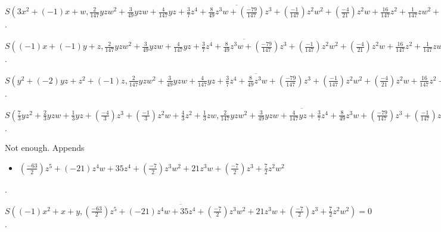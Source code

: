 \documentclass{jsarticle}
\begin{document}
$\overline{S(3x^{2}+(-1)x+w, \frac{2}{147}yzw^{2}+\frac{3}{49}yzw+\frac{4}{147}yz+\frac{3}{7}z^{4}+\frac{8}{49}z^{3}w+(\frac{-79}{147})z^{3}+(\frac{-1}{147})z^{2}w^{2}+(\frac{-4}{21})z^{2}w+\frac{16}{147}z^{2}+\frac{1}{147}zw^{2}+\frac{4}{147}zw)} = (\frac{-1}{84})yzw+(\frac{-1}{21})yz+(\frac{-63}{2})z^{5}+(\frac{-39}{2})z^{4}w+\frac{137}{4}z^{4}+(\frac{-5}{2})z^{3}w^{2}+\frac{113}{6}z^{3}w+(\frac{-215}{84})z^{3}+\frac{1}{6}z^{2}w^{3}+\frac{29}{12}z^{2}w^{2}+\frac{5}{7}z^{2}w+(\frac{-4}{21})z^{2}+(\frac{-1}{6})zw^{3}+\frac{1}{12}zw^{2}+(\frac{-1}{21})zw$.  

$\overline{S((-1)x+(-1)y+z, \frac{2}{147}yzw^{2}+\frac{3}{49}yzw+\frac{4}{147}yz+\frac{3}{7}z^{4}+\frac{8}{49}z^{3}w+(\frac{-79}{147})z^{3}+(\frac{-1}{147})z^{2}w^{2}+(\frac{-4}{21})z^{2}w+\frac{16}{147}z^{2}+\frac{1}{147}zw^{2}+\frac{4}{147}zw)} = (\frac{-1}{4})yzw+(-1)yz+(\frac{-27}{2})z^{5}+(-9)z^{4}w+\frac{69}{4}z^{4}+(\frac{-3}{2})z^{3}w^{2}+\frac{21}{2}z^{3}w+(\frac{-7}{4})z^{3}+\frac{7}{4}z^{2}w^{2}+(\frac{-1}{2})z^{2}w+(-2)z^{2}+(\frac{-1}{4})zw^{2}+(-1)zw$.  

$\overline{S(y^{2}+(-2)yz+z^{2}+(-1)z, \frac{2}{147}yzw^{2}+\frac{3}{49}yzw+\frac{4}{147}yz+\frac{3}{7}z^{4}+\frac{8}{49}z^{3}w+(\frac{-79}{147})z^{3}+(\frac{-1}{147})z^{2}w^{2}+(\frac{-4}{21})z^{2}w+\frac{16}{147}z^{2}+\frac{1}{147}zw^{2}+\frac{4}{147}zw)} = \frac{1}{4}yzw+yz+(-18)z^{5}+(-12)z^{4}w+\frac{71}{4}z^{4}+(-2)z^{3}w^{2}+\frac{21}{2}z^{3}w+(\frac{-7}{4})z^{3}+\frac{7}{4}z^{2}w^{2}+\frac{1}{2}z^{2}w+2z^{2}+\frac{1}{4}zw^{2}+zw$.  

$\overline{S(\frac{7}{3}yz^{2}+\frac{2}{3}yzw+\frac{1}{3}yz+(\frac{-4}{3})z^{3}+(\frac{-1}{3})z^{2}w+\frac{4}{3}z^{2}+\frac{1}{3}zw, \frac{2}{147}yzw^{2}+\frac{3}{49}yzw+\frac{4}{147}yz+\frac{3}{7}z^{4}+\frac{8}{49}z^{3}w+(\frac{-79}{147})z^{3}+(\frac{-1}{147})z^{2}w^{2}+(\frac{-4}{21})z^{2}w+\frac{16}{147}z^{2}+\frac{1}{147}zw^{2}+\frac{4}{147}zw)} = (\frac{-63}{2})z^{5}+(-21)z^{4}w+35z^{4}+(\frac{-7}{2})z^{3}w^{2}+21z^{3}w+(\frac{-7}{2})z^{3}+\frac{7}{2}z^{2}w^{2}$.  

Not enough.  Appends \begin{itemize}
\item $(\frac{-63}{2})z^{5}+(-21)z^{4}w+35z^{4}+(\frac{-7}{2})z^{3}w^{2}+21z^{3}w+(\frac{-7}{2})z^{3}+\frac{7}{2}z^{2}w^{2}$
\end{itemize}  . 


$\overline{S((-1)x^{2}+x+y, (\frac{-63}{2})z^{5}+(-21)z^{4}w+35z^{4}+(\frac{-7}{2})z^{3}w^{2}+21z^{3}w+(\frac{-7}{2})z^{3}+\frac{7}{2}z^{2}w^{2})} = 0$.  
\end{document}
